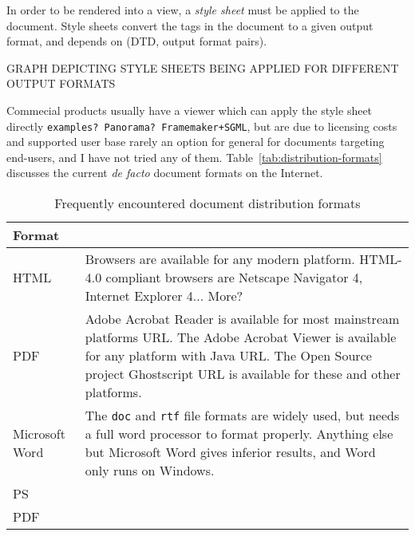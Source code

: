 In order to be rendered into a view, a \textit{style sheet} must be
applied to the document.  Style sheets convert the tags in the
document to a given output format, and depends on (DTD, output format
pairs).


\textsf{GRAPH DEPICTING STYLE SHEETS BEING APPLIED FOR DIFFERENT
  OUTPUT FORMATS}





Commecial products usually have a viewer which can apply the style
sheet directly \texttt{examples? Panorama? Framemaker+SGML}, but are
due to licensing costs and supported user base rarely an option for
general for documents targeting end-users, and I have not tried any of
them.  Table~\vref{tab:distribution-formats} discusses the current
\textit{de facto} document formats on the Internet.


\begin{table}[htbp]
  \begin{center}
    \begin{tabular}{|l|p{10cm}|}
      \hline\hline
      Format & \\
      \hline

      HTML & Browsers are available for any modern platform.  HTML-4.0
      compliant browsers are Netscape Navigator 4, Internet Explorer
      4... \textsf{More?} \\ 
      
      PDF & Adobe Acrobat Reader is available for most
      mainstream platforms \textsf{URL}.  The Adobe Acrobat Viewer is
      available for any platform with Java \textsf{URL}.  The Open
      Source project Ghostscript \textsf{URL} is available for these
      and other platforms. \\
  
      
      Microsoft Word & The \texttt{doc} and \texttt{rtf} file formats
      are widely used, but needs a full word processor to format
      properly.  Anything else but Microsoft Word gives inferior
      results, and Word only runs on Windows.
      \\
      PS & \\
      PDF &\\

      \hline
    \end{tabular}
    \caption{Frequently encountered document distribution formats}
    \label{tab:distribution-formats}
  \end{center}
\end{table}



